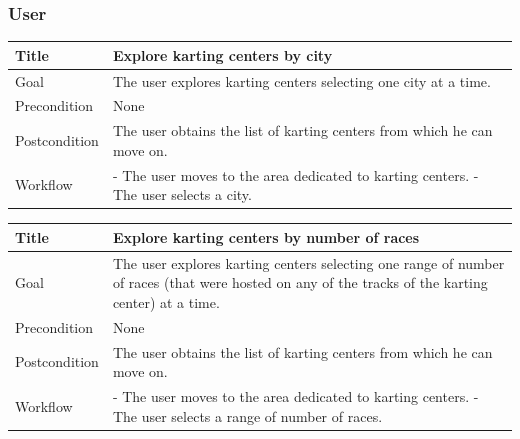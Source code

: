 \documentclass{beamer}
\begin{document}
\begin{frame}
\frametitle{User}
\begin{table}
    \tiny
    \begin{tabular}{|p{2cm}|p{6cm}|}
    \hline
    Title & \textbf{Explore karting centers by city} \\
    \hline
    Goal & The user explores karting centers selecting one city at a time. \\
    \hline
    Precondition & None \\
    \hline
    Postcondition & The user obtains the list of karting centers from which he can move on.\\
    \hline
    Workflow &
    - The user moves to the area dedicated to karting centers. \newline
    - The user selects a city. \\
    \hline
    \end{tabular}
\end{table}

    \begin{table}
        \tiny
        \begin{tabular}{|p{2cm}|p{6cm}|}
        \hline
        Title & \textbf{Explore karting centers by number of races} \\
        \hline
        Goal & The user explores karting centers selecting one range of number of races (that
        were hosted on any of the tracks of the karting center) at a time. \\
        \hline
        Precondition & None \\
        \hline
        Postcondition & The user obtains the list of karting centers from which he can move on.\\
        \hline
        Workflow &
        - The user moves to the area dedicated to karting centers. \newline
        - The user selects a range of number of races. \\
        \hline
        \end{tabular}
\end{table}
\end{frame}


\end{document}
